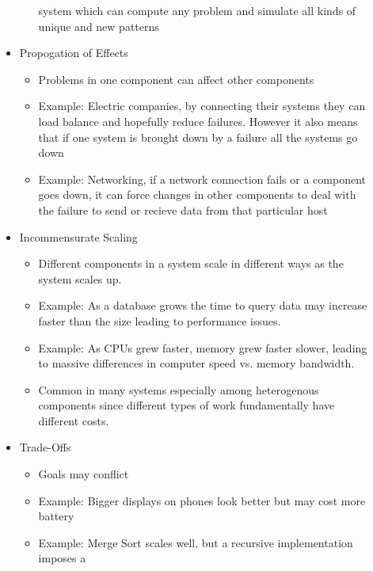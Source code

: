 \documentclass{report}
\begin{document}
\begin{description}
\begin{itemize}
\begin{itemize}
                        system which can compute any problem and simulate all kinds of unique and
                        new patterns
                \end{itemize}
            \item Propogation of Effects
                \begin{itemize}
                    \item Problems in one component can affect other components
                    \item Example: Electric companies, by connecting their systems they can
                        load balance and hopefully reduce failures. However it also means that
                        if one system is brought down by a failure all the systems go down
                    \item Example: Networking, if a network connection fails or a component
                        goes down, it can force changes in other components to deal with
                        the failure to send or recieve data from that particular host
                \end{itemize}
            \item Incommensurate Scaling
                \begin{itemize}
                    \item Different components in a system scale in different ways as the system
                        scales up.
                    \item Example: As a database grows the time to query data may increase faster
                        than the size leading to performance issues.
                    \item Example: As CPUs grew faster, memory grew faster slower, leading to
                        massive differences in computer speed vs. memory bandwidth.
                    \item Common in many systems especially among heterogenous components since
                        different types of work fundamentally have different costs.
                \end{itemize}
            \item Trade-Offs
                \begin{itemize}
                    \item Goals may conflict
                    \item Example: Bigger displays on phones look better but may cost more battery
                    \item Example: Merge Sort scales well, but a recursive implementation imposes a

\end{itemize}
\end{itemize}
\end{description}
\end{document}
